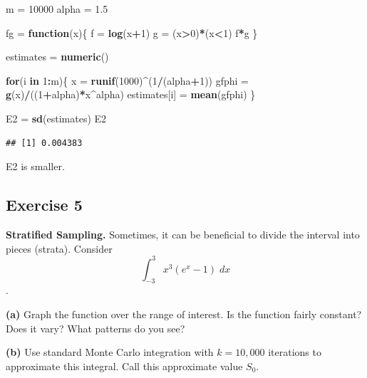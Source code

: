 \documentclass[
]{article}
\newenvironment{Shaded}{\begin{snugshade}}{\end{snugshade}}
\newcommand{\ControlFlowTok}[1]{\textcolor[rgb]{0.13,0.29,0.53}{\textbf{#1}}}
\newcommand{\DecValTok}[1]{\textcolor[rgb]{0.00,0.00,0.81}{#1}}
\newcommand{\FloatTok}[1]{\textcolor[rgb]{0.00,0.00,0.81}{#1}}
\newcommand{\KeywordTok}[1]{\textcolor[rgb]{0.13,0.29,0.53}{\textbf{#1}}}
\newcommand{\NormalTok}[1]{#1}
\newcommand{\OperatorTok}[1]{\textcolor[rgb]{0.81,0.36,0.00}{\textbf{#1}}}
\newcommand{\StringTok}[1]{\textcolor[rgb]{0.31,0.60,0.02}{#1}}
\begin{document}
\begin{Shaded}
\begin{Highlighting}[]
\NormalTok{m =}\StringTok{ }\DecValTok{10000}
\NormalTok{alpha =}\StringTok{ }\FloatTok{1.5}

\NormalTok{fg =}\StringTok{ }\ControlFlowTok{function}\NormalTok{(x)\{}
\NormalTok{  f =}\StringTok{ }\KeywordTok{log}\NormalTok{(x}\OperatorTok{+}\DecValTok{1}\NormalTok{)}
\NormalTok{  g =}\StringTok{ }\NormalTok{(x}\OperatorTok{>}\DecValTok{0}\NormalTok{)}\OperatorTok{*}\NormalTok{(x}\OperatorTok{<}\DecValTok{1}\NormalTok{)}
\NormalTok{  f}\OperatorTok{*}\NormalTok{g}
\NormalTok{\}}


\NormalTok{estimates =}\StringTok{ }\KeywordTok{numeric}\NormalTok{()}

\ControlFlowTok{for}\NormalTok{(i }\ControlFlowTok{in} \DecValTok{1}\OperatorTok{:}\NormalTok{m)\{}
\NormalTok{  x =}\StringTok{ }\KeywordTok{runif}\NormalTok{(}\DecValTok{1000}\NormalTok{)}\OperatorTok{^}\NormalTok{(}\DecValTok{1}\OperatorTok{/}\NormalTok{(alpha}\OperatorTok{+}\DecValTok{1}\NormalTok{))}
\NormalTok{  gfphi =}\StringTok{ }\KeywordTok{g}\NormalTok{(x)}\OperatorTok{/}\NormalTok{((}\DecValTok{1}\OperatorTok{+}\NormalTok{alpha)}\OperatorTok{*}\NormalTok{x}\OperatorTok{^}\NormalTok{alpha)}
\NormalTok{  estimates[i] =}\StringTok{ }\KeywordTok{mean}\NormalTok{(gfphi)}
\NormalTok{\}}

\NormalTok{E2 =}\StringTok{ }\KeywordTok{sd}\NormalTok{(estimates)}
\NormalTok{E2}
\end{Highlighting}
\end{Shaded}

\begin{verbatim}
## [1] 0.004383
\end{verbatim}

E2 is smaller.

\hypertarget{exercise-5}{%
\subsection{Exercise 5}\label{exercise-5}}

\textbf{Stratified Sampling.} Sometimes, it can be beneficial to divide
the interval into pieces (strata). Consider
\[ \int_{-3}^3 x^3(e^x-1) \; dx\].

\textbf{(a)} Graph the function over the range of interest. Is the
function fairly constant? Does it vary? What patterns do you see?

\textbf{(b)} Use standard Monte Carlo integration with \(k = 10,000\)
iterations to approximate this integral. Call this approximate value
\(S_0\).
\end{document}
